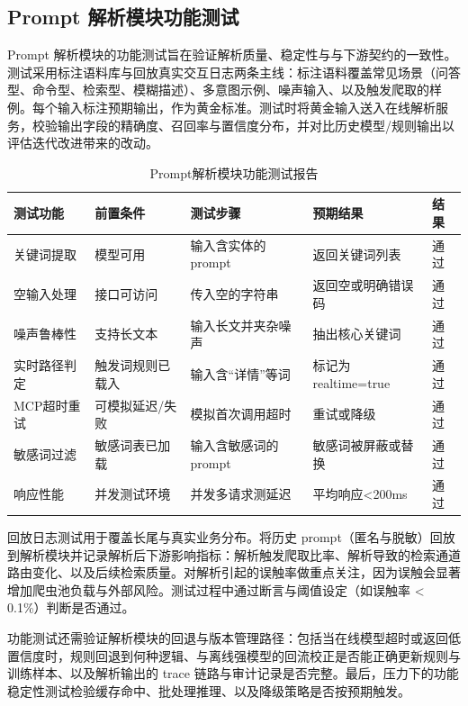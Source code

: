 \subsection{Prompt 解析模块功能测试} 
Prompt 解析模块的功能测试旨在验证解析质量、稳定性与与下游契约的一致性。测试采用标注语料库与回放真实交互日志两条主线：标注语料覆盖常见场景（问答型、命令型、检索型、模糊描述）、多意图示例、噪声输入、以及触发爬取的样例。每个输入标注预期输出，作为黄金标准。测试时将黄金输入送入在线解析服务，校验输出字段的精确度、召回率与置信度分布，并对比历史模型/规则输出以评估迭代改进带来的改动。
\begin{table}[htb]
\centering
\caption{Prompt解析模块功能测试报告}
\label{tab:prompt-parsing-test-brief}
{\renewcommand{\arraystretch}{1.2}
\begin{tabular}{p{2.5cm} p{3cm} p{2cm} p{3.5cm} p{1cm}}
\hline
测试功能 & 前置条件 & 测试步骤 & 预期结果 & 结果 \\
\hline
关键词提取 & 模型可用 & 输入含实体的prompt & 返回关键词列表 & 通过 \\\hline
空输入处理 & 接口可访问 & 传入空的字符串 & 返回空或明确错误码 & 通过 \\\hline
噪声鲁棒性 & 支持长文本 & 输入长文并夹杂噪声 & 抽出核心关键词 & 通过 \\\hline
实时路径判定 & 触发词规则已载入 & 输入含“详情”等词 & 标记为realtime=true & 通过 \\\hline
MCP超时重试 & 可模拟延迟/失败 & 模拟首次调用超时 & 重试或降级 & 通过 \\\hline
敏感词过滤 & 敏感词表已加载 & 输入含敏感词的prompt & 敏感词被屏蔽或替换 & 通过 \\\hline
响应性能 & 并发测试环境 & 并发多请求测延迟 & 平均响应<200ms & 通过 \\\hline
\end{tabular}
}
\end{table}
回放日志测试用于覆盖长尾与真实业务分布。将历史 prompt（匿名与脱敏）回放到解析模块并记录解析后下游影响指标：解析触发爬取比率、解析导致的检索通道路由变化、以及后续检索质量。对解析引起的误触率做重点关注，因为误触会显著增加爬虫池负载与外部风险。测试过程中通过断言与阈值设定（如误触率 < 0.1\%）判断是否通过。

功能测试还需验证解析模块的回退与版本管理路径：包括当在线模型超时或返回低置信度时，规则回退到何种逻辑、与离线强模型的回流校正是否能正确更新规则与训练样本、以及解析输出的 trace 链路与审计记录是否完整。最后，压力下的功能稳定性测试检验缓存命中、批处理推理、以及降级策略是否按预期触发。
